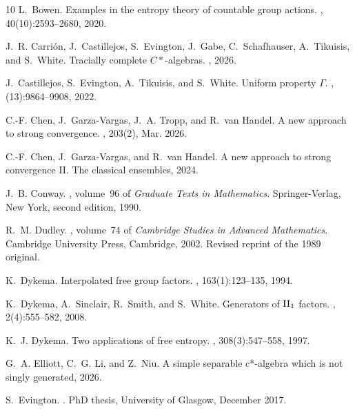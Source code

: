 \documentclass[10pt]{amsart}
\theoremstyle{definition}
\numberwithin{equation}{section}
\begin{document}
\begin{thebibliography}{10}
L.~Bowen.
\newblock Examples in the entropy theory of countable group actions.
, 40(10):2593--2680, 2020.

J.~R. Carri\'{o}n, J.~Castillejos, S.~Evington, J.~Gabe, C.~Schafhauser, A.~Tikuisis, and S.~White.
\newblock Tracially complete ${C}*$-algebras.
, 2026.

J.~Castillejos, S.~Evington, A.~Tikuisis, and S.~White.
\newblock Uniform property {$\Gamma$}.
, (13):9864--9908, 2022.

C.-F. Chen, J.~Garza-Vargas, J.~A. Tropp, and R.~van Handel.
\newblock A new approach to strong convergence.
, 203(2), Mar. 2026.

C.-F. Chen, J.~Garza-Vargas, and R.~van Handel.
\newblock A new approach to strong convergence {II}. {T}he classical ensembles, 2024.

J.~B. Conway.
, volume~96 of {\em Graduate Texts in Mathematics}.
\newblock Springer-Verlag, New York, second edition, 1990.

R.~M. Dudley.
, volume~74 of {\em Cambridge Studies in Advanced Mathematics}.
\newblock Cambridge University Press, Cambridge, 2002.
\newblock Revised reprint of the 1989 original.

K.~Dykema.
\newblock Interpolated free group factors.
, 163(1):123--135, 1994.

K.~Dykema, A.~Sinclair, R.~Smith, and S.~White.
\newblock Generators of {$\rm II_1$} factors.
, 2(4):555--582, 2008.

K.~J. Dykema.
\newblock Two applications of free entropy.
, 308(3):547--558, 1997.

G.~A. Elliott, C.~G. Li, and Z.~Niu.
\newblock A simple separable c*-algebra which is not singly generated, 2026.

S.~Evington.
.
\newblock PhD thesis, University of Glasgow, December 2017.


\end{thebibliography}
\end{document}
